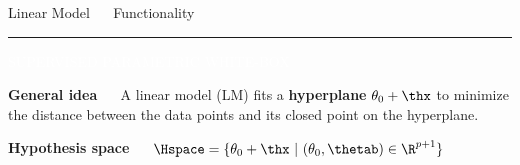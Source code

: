 \documentclass[11pt,compress,t,notes=noshow, xcolor=table]{beamer}
\begin{document}





\LARGE
\begin{frame}{\textcolor{gray!80}{Linear Model} ~~ Functionality}
\normalsize
\vspace{-0.5cm}
\noindent \textcolor{gray!80}{\rule{\textwidth}{1pt}}

\vspace{0.3cm}

\footnotesize

\colorbox{gray!80}{\textcolor{white}{SUPERVISED}} 
\colorbox{gray!80}{\textcolor{white}{PARAMETRIC}} 
\colorbox{gray!80}{\textcolor{white}{WHITE-BOX}}

\medskip

\textbf{\textcolor{gray!80}{General idea}} ~~  
A linear model (LM) fits a \textbf{hyperplane} $\theta_0 + \thx$ to minimize the distance between the data points and its closed point on the hyperplane. 

\medskip

\textbf{\textcolor{gray!80}{Hypothesis space}} ~~
$\Hspace = \{ \theta_0 + \thx\ |\ (\theta_0, \thetab) \in \R^{p+1} \}$




\end{frame}
\end{document}
